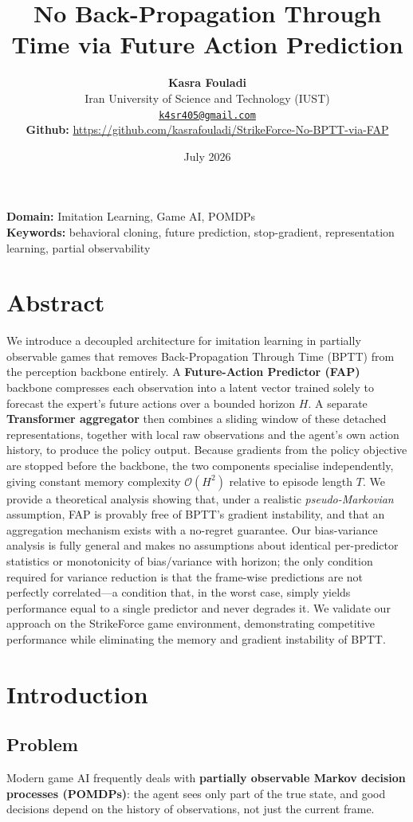 \documentclass[11pt]{article}
\title{\textbf{No Back-Propagation Through Time via Future Action Prediction}}
\author{\textbf{Kasra Fouladi} \\ \small Iran University of Science and Technology (IUST) \\ \small \href{mailto:k4sr405@gmail.com}{\texttt{k4sr405@gmail.com}} \\ \small \textbf{Github:} \url{https://github.com/kasrafouladi/StrikeForce-No-BPTT-via-FAP}}
\date{July 2026}
\begin{document}
\maketitle

\noindent\textbf{Domain:} Imitation Learning, Game AI, POMDPs \\
\textbf{Keywords:} behavioral cloning, future prediction, stop-gradient, representation learning, partial observability

\hrulefill

\section{Abstract}

We introduce a decoupled architecture for imitation learning in partially observable games that removes Back-Propagation Through Time (BPTT) from the perception backbone entirely. A \textbf{Future-Action Predictor (FAP)} backbone compresses each observation into a latent vector trained solely to forecast the expert's future actions over a bounded horizon \(H\). A separate \textbf{Transformer aggregator} then combines a sliding window of these detached representations, together with local raw observations and the agent's own action history, to produce the policy output. Because gradients from the policy objective are stopped before the backbone, the two components specialise independently, giving constant memory complexity \(\mathcal{O}(H^2)\) relative to episode length \(T\). We provide a theoretical analysis showing that, under a realistic \emph{pseudo-Markovian} assumption, FAP is provably free of BPTT's gradient instability, and that an aggregation mechanism exists with a no-regret guarantee. Our bias-variance analysis is fully general and makes no assumptions about identical per-predictor statistics or monotonicity of bias/variance with horizon; the only condition required for variance reduction is that the frame-wise predictions are not perfectly correlated—a condition that, in the worst case, simply yields performance equal to a single predictor and never degrades it. We validate our approach on the StrikeForce game environment, demonstrating competitive performance while eliminating the memory and gradient instability of BPTT.

\section{Introduction}

\subsection{Problem}
Modern game AI frequently deals with \textbf{partially observable Markov decision processes (POMDPs)}: the agent sees only part of the true state, and good decisions depend on the history of observations, not just the current frame.
\end{document}
